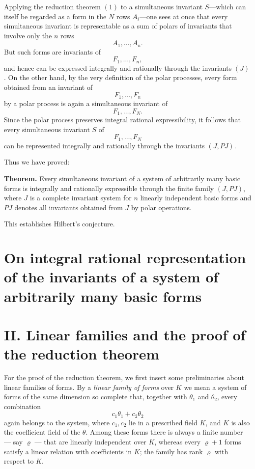 \documentclass[11pt]{article}
\begin{document}
Applying the reduction theorem \((1)\) to a simultaneous invariant \(S\)---which can itself be regarded as a form in the \(N\) rows \(A_i\)---one sees at once that every simultaneous invariant is representable as a sum of polars of invariants that involve only the \(n\) rows
\[
A_1,\dots,A_n.
\]
But such forms are invariants of
\[
F_1,\dots,F_n,
\]
and hence can be expressed integrally and rationally through the invariants \((J)\). On the other hand, by the very definition of the polar processes, every form obtained from an invariant of
\[
F_1,\dots,F_n
\]
by a polar process is again a simultaneous invariant of
\[
F_1,\dots,F_N.
\]
Since the polar process preserves integral rational expressibility, it follows that every simultaneous invariant \(S\) of
\[
F_1,\dots,F_N
\]
can be represented integrally and rationally through the invariants \((J,PJ)\).

Thus we have proved:

\medskip
\noindent\textbf{Theorem.}
Every simultaneous invariant of a system of arbitrarily many basic forms is integrally and rationally expressible through the finite family \((J,PJ)\), where \(J\) is a complete invariant system for \(n\) linearly independent basic forms and \(PJ\) denotes all invariants obtained from \(J\) by polar operations.

\medskip
This establishes Hilbert's conjecture.

\bigskip

\clearpage

\section*{On integral rational representation of the invariants of a system of arbitrarily many basic forms}

\section*{II. Linear families and the proof of the reduction theorem}

For the proof of the reduction theorem, we first insert some preliminaries about linear families of forms. By a \emph{linear family of forms} over \(K\) we mean a system of forms of the same dimension so complete that, together with \(\theta_1\) and \(\theta_2\), every combination
\[
c_1\theta_1+c_2\theta_2
\]
again belongs to the system, where \(c_1,c_2\) lie in a prescribed field \(K\), and \(K\) is also the coefficient field of the \(\theta\). Among these forms there is always a finite number --- say \(\varrho\) --- that are linearly independent over \(K\), whereas every \(\varrho+1\) forms satisfy a linear relation with coefficients in \(K\); the family has rank \(\varrho\) with respect to \(K\).
\end{document}
